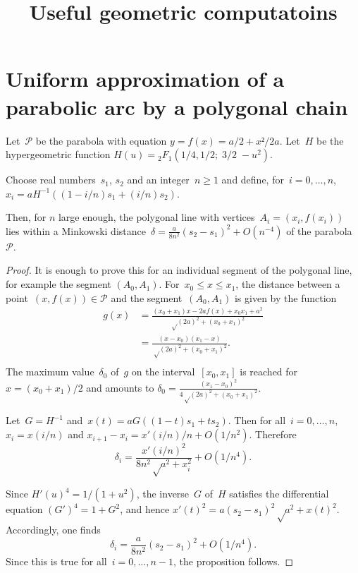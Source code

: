 \documentclass{article}
\begin{document}
\title{Useful geometric computatoins}


\section{Uniform approximation of a parabolic arc by a polygonal chain}%
\begin{prop}\label{prop:points}
Let~$𝒫$ be the parabola with equation $y = f(x) = a/2 + x²/2a$.
Let~$H$ be the hypergeometric function
$H(u) = {}_2F_1(1/4,1/2;\;3/2\;-u^2)$.

Choose real numbers~$s_1$, $s_2$ and an integer~$n ≥ 1$
and define, for~$i = 0, …, n$,
$x_i = a H^{-1}((1-i/n) s_1 + (i/n) s_2)$.

Then, for $n$ large enough,
the polygonal line with vertices~$A_i = (x_i, f(x_i))$
lies within a Minkowski distance~$δ = \frac{a}{8n^2}
(s_2-s_1)^2+O(n^{-4})$ of the parabola~$𝒫$.
\end{prop}

\begin{proof}
It is enough to prove this for an individual segment of the polygonal line,
for example the segment $(A_0, A_1)$.
For~$x_0 ≤ x ≤ x_1$, the distance between a point~$(x, f(x)) ∈ 𝒫$
and the segment~$(A_0, A_1)$ is given by the function
\begin{equation}\begin{split}
g(x)
 &= \frac{(x_0+x_1) x - 2a f(x) + x_0 x_1 + a^2}{√{(2a)^2+(x_0+x_1)^2}}\\
 &= \frac{(x-x_0)(x_1-x)}{√{(2a)^2+(x_0+x_1)^2}}.\\
\end{split}\end{equation}
The maximum value~$δ_0$ of~$g$ on the interval~$[x_0,x_1]$
is reached for~$x = (x_0+x_1)/2$
and amounts to $δ_0 = \frac{(x_1-x_0)^2}{4√{(2a)^2+(x_0+x_1)^2}}$.

Let~$G = H^{-1}$ and~$x(t) = a G((1-t) s_1 + t s_2)$.
Then for all~$i = 0,…, n$, $x_i = x(i/n)$
and $x_{i+1} - x_i = x'(i/n)/n + O(1/n^2)$.
Therefore
\begin{equation}
δ_i = \frac{x'(i/n)^2}{8n^2 √{a^2 + x_i^2}} + O(1/n^4).
\end{equation}

Since $H'(u)^4 = 1/(1+u^2)$,
the inverse~$G$ of~$H$ satisfies the differential equation
$(G')^4 = 1 + G^2$,
and hence $x'(t)^2 = a (s_2 - s_1)^2 √{a^2 + x(t)^2}$.
Accordingly, one finds
\begin{equation}
δ_i = \frac{a}{8n^2} (s_2-s_1)^2 + O(1/n^4).
\end{equation}
Since this is true for all~$i = 0,…,n-1$, the proposition follows.
\end{proof}
\end{document}
